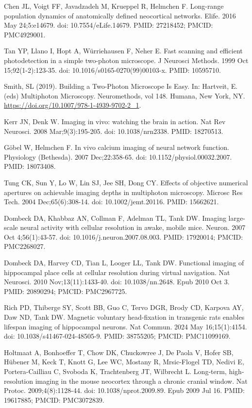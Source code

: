 \documentclass[10pt,letterpaper]{article}
\begin{document}
\begin{thebibliography}{10}
Chen JL, Voigt FF, Javadzadeh M, Krueppel R, Helmchen F. Long-range population dynamics of anatomically defined neocortical networks. Elife. 2016 May 24;5:e14679. doi: 10.7554/eLife.14679. PMID: 27218452; PMCID: PMC4929001.

Tan YP, Llano I, Hopt A, Würriehausen F, Neher E. Fast scanning and efficient photodetection in a simple two-photon microscope. J Neurosci Methods. 1999 Oct 15;92(1-2):123-35. doi: 10.1016/s0165-0270(99)00103-x. PMID: 10595710.

Smith, SL (2019). Building a Two-Photon Microscope Is Easy. In: Hartveit, E. (eds) Multiphoton Microscopy. Neuromethods, vol 148. Humana, New York, NY. \url{https://doi.org/10.1007/978-1-4939-9702-2_1}.

Kerr JN, Denk W. Imaging in vivo: watching the brain in action. Nat Rev Neurosci. 2008 Mar;9(3):195-205. doi: 10.1038/nrn2338. PMID: 18270513.

G\"obel W, Helmchen F. In vivo calcium imaging of neural network function. Physiology (Bethesda). 2007 Dec;22:358-65. doi: 10.1152/physiol.00032.2007. PMID: 18073408.

Tung CK, Sun Y, Lo W, Lin SJ, Jee SH, Dong CY. Effects of objective numerical apertures on achievable imaging depths in multiphoton microscopy. Microsc Res Tech. 2004 Dec;65(6):308-14. doi: 10.1002/jemt.20116. PMID: 15662621.

Dombeck DA, Khabbaz AN, Collman F, Adelman TL, Tank DW. Imaging large-scale neural activity with cellular resolution in awake, mobile mice. Neuron. 2007 Oct 4;56(1):43-57. doi: 10.1016/j.neuron.2007.08.003. PMID: 17920014; PMCID: PMC2268027.

Dombeck DA, Harvey CD, Tian L, Looger LL, Tank DW. Functional imaging of hippocampal place cells at cellular resolution during virtual navigation. Nat Neurosci. 2010 Nov;13(11):1433-40. doi: 10.1038/nn.2648. Epub 2010 Oct 3. PMID: 20890294; PMCID: PMC2967725.

Rich PD, Thiberge SY, Scott BB, Guo C, Tervo DGR, Brody CD, Karpova AY, Daw ND, Tank DW. Magnetic voluntary head-fixation in transgenic rats enables lifespan imaging of hippocampal neurons. Nat Commun. 2024 May 16;15(1):4154. doi: 10.1038/s41467-024-48505-9. PMID: 38755205; PMCID: PMC11099169.

Holtmaat A, Bonhoeffer T, Chow DK, Chuckowree J, De Paola V, Hofer SB, Hübener M, Keck T, Knott G, Lee WC, Mostany R, Mrsic-Flogel TD, Nedivi E, Portera-Cailliau C, Svoboda K, Trachtenberg JT, Wilbrecht L. Long-term, high-resolution imaging in the mouse neocortex through a chronic cranial window. Nat Protoc. 2009;4(8):1128-44. doi: 10.1038/nprot.2009.89. Epub 2009 Jul 16. PMID: 19617885; PMCID: PMC3072839.


\end{thebibliography}
\end{document}
